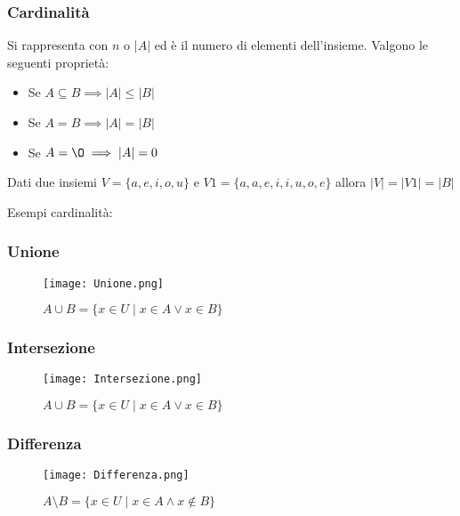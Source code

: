 \subsubsection{Cardinalità}
\label{sec:cardinalita}
Si rappresenta con $n$ o $\lvert A \rvert$ ed è il numero di elementi dell'insieme. Valgono le seguenti proprietà:
\begin{itemize}
	\item Se $A \subseteq B \implies \lvert A \rvert \leq \lvert B \rvert$ 
	\item Se $A = B \implies \lvert A \rvert = \lvert B \rvert$
	\item Se $A = \O \implies \vert A \rvert = 0$
\end{itemize}
\begin{note}
	Dati due insiemi $V = \{a, e, i, o ,u\}$ e $V1 = \{a, a, e, i, i, u, o, e\}$ allora $\lvert V \rvert = \lvert V1 \rvert = \lvert B \rvert$
\end{note}
\begin{example}
    Esempi cardinalità:\\
\end{example}

\subsubsection{Unione}
\begin{figure}[h!]
	\centering
    \texttt{[image: Unione.png]}
    \caption{$A \cup B = \{x \in U \mid x \in A \vee x \in B\}$}
    \label{fig:unione}
\end{figure}

\subsubsection{Intersezione}
\begin{figure}[h!]
	\centering
	\texttt{[image: Intersezione.png]}
	\caption{$A \cup B = \{x \in U \mid x \in A \vee x \in B\}$}
	\label{fig:intesezione}
\end{figure}

\subsubsection{Differenza}
\begin{figure}[h!]
	\centering
	\texttt{[image: Differenza.png]}
	\caption{$A \setminus B = \{x \in U \mid x \in A \wedge x \notin B\}$}
	\label{fig:differenza}
\end{figure}

